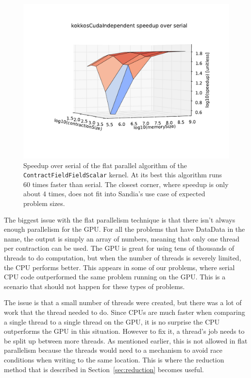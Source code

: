 \begin{figure}[!ht]
\includegraphics[scale=.8]{CFFS_VersusSerial_kokkosCudaIndependent.pdf}
\caption{Speedup over serial of the flat parallel algorithm of the
\texttt{ContractFieldFieldScalar} kernel. At its best this algorithm runs 60 times
faster than serial. The closest corner, where speedup is only about 4 times,
does not fit into Sandia's use case of expected problem sizes.
\label{lst:ContractFieldFieldScalar speedup over serial}} 
\end{figure}

The biggest issue with the flat parallelism technique is that there isn't
always enough parallelism for the GPU. For all the problems that have DataData
in the name, the output is simply an array of numbers, meaning that only one
thread per contraction can be used. The GPU is great for using tens of
thousands of threads to do computation, but when the number of threads is
severely limited, the CPU performs better. This appears in some of our problems, 
where serial CPU code outperformed the same problem running on
the GPU. This is a scenario that should not happen for these types of problems.

The issue is that a small number of threads were created, but there was a lot
of work that the thread needed to do. Since CPUs are much faster when
comparing a single thread to a single thread on the GPU, it is no surprise the
CPU outperforms the GPU in this situation. However to fix it, a thread's job
needs to be split up between more threads. As mentioned earlier, this is not
allowed in flat parallelism because the threads would need to a mechanism to
avoid race conditions when writing to the same location. This is where the
reduction method that is described in Section~\ref{sec:reduction} becomes useful.

